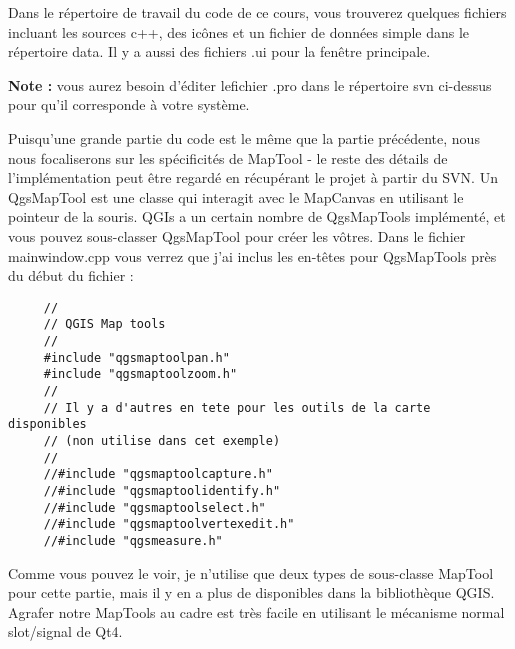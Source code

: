 Dans le r\'epertoire de travail du code de ce cours, vous trouverez quelques 
fichiers incluant les sources c++, des ic\^ones et un fichier de donn\'ees simple 
dans le r\'epertoire data. Il y a aussi des fichiers .ui pour la fen\^etre principale.

\textbf{Note :} vous aurez besoin d'\'editer lefichier .pro dans le r\'epertoire svn 
ci-dessus pour qu'il corresponde \`a votre syst\`eme.

Puisqu'une grande partie du code est le m\^eme que la partie pr\'ec\'edente, nous nous
focaliserons sur les sp\'ecificit\'es de MapTool - le reste des d\'etails de 
l'impl\'ementation peut \^etre regard\'e en r\'ecup\'erant le projet \`a partir du SVN. Un 
QgsMapTool est une classe qui interagit avec le MapCanvas en utilisant le pointeur
 de la souris. QGIs a un certain nombre de QgsMapTools impl\'ement\'e, et vous 
 pouvez sous-classer QgsMapTool pour cr\'eer les v\^otres. Dans le fichier 
 mainwindow.cpp vous verrez que j'ai inclus les en-t\^etes pour QgsMapTools pr\`es 
 du d\'ebut du fichier :
\begin{verbatim}
     //
     // QGIS Map tools
     //
     #include "qgsmaptoolpan.h"
     #include "qgsmaptoolzoom.h"
     //
     // Il y a d'autres en tete pour les outils de la carte disponibles
     // (non utilise dans cet exemple)
     //
     //#include "qgsmaptoolcapture.h"
     //#include "qgsmaptoolidentify.h"
     //#include "qgsmaptoolselect.h"
     //#include "qgsmaptoolvertexedit.h"
     //#include "qgsmeasure.h"
\end{verbatim}

Comme vous pouvez le voir, je n'utilise que deux types de sous-classe MapTool 
pour cette partie, mais il y en a plus de disponibles dans la biblioth\`eque QGIS.
Agrafer notre MapTools au cadre est tr\`es facile en utilisant le m\'ecanisme normal 
slot/signal de Qt4.

